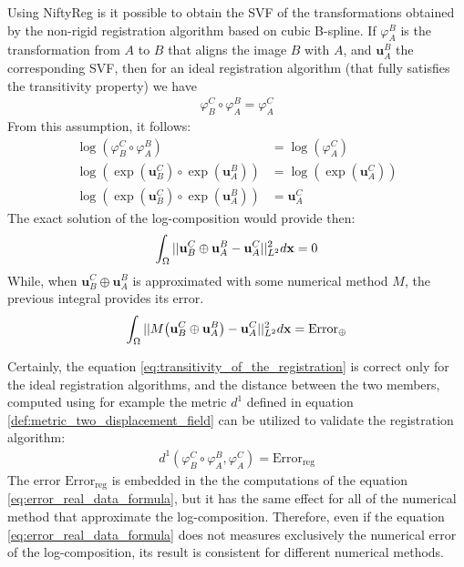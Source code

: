 Using NiftyReg is it possible to obtain the SVF of the transformations obtained by the non-rigid registration algorithm based on cubic B-spline. If $\varphi_{A}^{B}$ is the transformation from $A$ to $B$ that aligns the image $B$ with $A$, and $\mathbf{u}_{A}^{B}$ the corresponding SVF, then for an ideal registration algorithm (that fully satisfies the transitivity property) we have
\begin{align}\label{eq:transitivity_of_the_registration}
\varphi_{B}^{C} \circ \varphi_{A}^{B} = \varphi_{A}^{C}  
\end{align}
From this assumption, it follows:
\begin{align*}
\log(\varphi_{B}^{C} \circ \varphi_{A}^{B}) &= \log(\varphi_{A}^{C}  ) \\
\log(\exp(\mathbf{u}_{B}^{C}) \circ \exp(\mathbf{u}_{A}^{B})) &= \log(\exp(\mathbf{u}_{A}^{C}  ) ) \\
\log(\exp(\mathbf{u}_{B}^{C}) \circ \exp(\mathbf{u}_{A}^{B})) &= \mathbf{u}_{A}^{C}  
\end{align*}
The exact solution of the log-composition would provide then:
\begin{align*}
\int_{\Omega} \vert\lvert 
	\mathbf{u}_{B}^{C} \oplus \mathbf{u}_{A}^{B}
	-
	\mathbf{u}_{A}^{C}
 \rvert\vert_{L^2}^{2} d\mathbf{x} 
 =
 0
\end{align*} 
While, when $\mathbf{u}_{B}^{C} \oplus \mathbf{u}_{A}^{B}$ is approximated with some numerical method $M$, the previous integral provides its error.
\begin{align}\label{eq:error_real_data_formula} 
\int_{\Omega} \vert\lvert 
	M\big(\mathbf{u}_{B}^{C} \oplus \mathbf{u}_{A}^{B} \big)
	-
	\mathbf{u}_{A}^{C}
 \rvert\vert_{L^2}^{2} d\mathbf{x} 
=
\text{Error}_{\oplus}
\end{align} 

Certainly, the equation \ref{eq:transitivity_of_the_registration} is correct only for the ideal registration algorithms, and the distance between the two members, computed using for example the metric $d^{1}$ defined in equation \ref{def:metric_two_displacement_field} can be utilized to validate the registration algorithm:
\begin{align*}
d^{1}(\varphi_{B}^{C} \circ \varphi_{A}^{B} ,\varphi_{A}^{C}) 
= 
\text{Error}_{\text{reg}}
\end{align*} 
The error $\text{Error}_{\text{reg}}$ is embedded in the the computations of the equation \ref{eq:error_real_data_formula}, but it has the same effect for all of the numerical method that approximate the log-composition. Therefore, even if the equation \ref{eq:error_real_data_formula} does not measures exclusively the numerical error of the log-composition, its result is consistent for different numerical methods.


